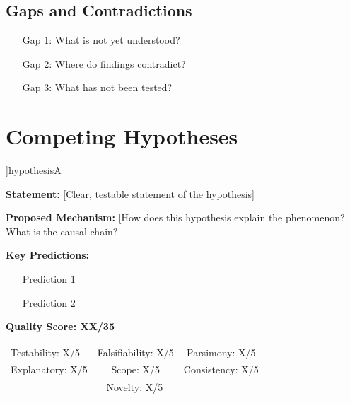 \documentclass[11pt,a4paper]{article}
\begin{document}
\subsection*{Gaps and Contradictions}
\begin{challengebox}
\begin{enumerate}
    \item [Gap 1: What is not yet understood?]
    \item [Gap 2: Where do findings contradict?]
    \item [Gap 3: What has not been tested?]
\end{enumerate}
\end{challengebox}

\newpage

\section{Competing Hypotheses}

\begin{hypothesisbox}[H1: [Hypothesis Name]]{hypothesisA}

\textbf{Statement:} [Clear, testable statement of the hypothesis]

\textbf{Proposed Mechanism:} [How does this hypothesis explain the phenomenon? What is the causal chain?]

\textbf{Key Predictions:}
\begin{enumerate}
    \item [Prediction 1]
    \item [Prediction 2]
\end{enumerate}

\textbf{Quality Score: XX/35}
\begin{center}
\footnotesize
\begin{tabular}{lccc}
Testability: X/5 & Falsifiability: X/5 & Parsimony: X/5 \\
Explanatory: X/5 & Scope: X/5 & Consistency: X/5 \\
\multicolumn{3}{c}{Novelty: X/5}
\end{tabular}
\end{center}
\end{hypothesisbox}

\vspace{0.5em}
\end{document}
